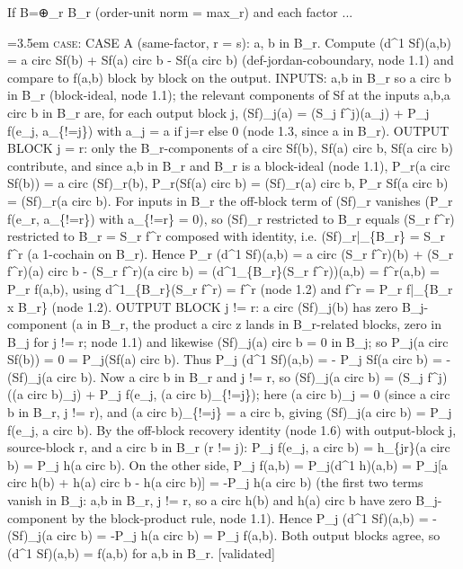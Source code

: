 \documentclass{article}
\newcommand{\step}[1]{\par\noindent\hangindent=3.5em\hangafter=1%
  \makebox[3.5em][l]{\textbf{#1.}}}
\newcommand{\steptag}[1]{\hfill{\small\textsf{[#1]}}}
\begin{document}
\begin{proofbox}{If B=⊕\_r B\_r (order-unit norm = max\_r) and each factor ...}
\step{1.7.1} \textsc{case}: CASE A (same-factor, r = s): a, b in B\_r. Compute (d\textasciicircum{}1 Sf)(a,b) = a circ Sf(b) + Sf(a) circ b - Sf(a circ b) (def-jordan-coboundary, node 1.1) and compare to f(a,b) block by block on the output. INPUTS: a,b in B\_r so a circ b in B\_r (block-ideal, node 1.1); the relevant components of Sf at the inputs a,b,a circ b in B\_r are, for each output block j, (Sf)\_j(a) = (S\_j f\textasciicircum{}j)(a\_j) + P\_j f(e\_j, a\_\{!=j\}) with a\_j = a if j=r else 0 (node 1.3, since a in B\_r). OUTPUT BLOCK j = r: only the B\_r-components of a circ Sf(b), Sf(a) circ b, Sf(a circ b) contribute, and since a,b in B\_r and B\_r is a block-ideal (node 1.1), P\_r(a circ Sf(b)) = a circ (Sf)\_r(b), P\_r(Sf(a) circ b) = (Sf)\_r(a) circ b, P\_r Sf(a circ b) = (Sf)\_r(a circ b). For inputs in B\_r the off-block term of (Sf)\_r vanishes (P\_r f(e\_r, a\_\{!=r\}) with a\_\{!=r\} = 0), so (Sf)\_r restricted to B\_r equals (S\_r f\textasciicircum{}r) restricted to B\_r = S\_r f\textasciicircum{}r composed with identity, i.e. (Sf)\_r|\_\{B\_r\} = S\_r f\textasciicircum{}r (a 1-cochain on B\_r). Hence P\_r (d\textasciicircum{}1 Sf)(a,b) = a circ (S\_r f\textasciicircum{}r)(b) + (S\_r f\textasciicircum{}r)(a) circ b - (S\_r f\textasciicircum{}r)(a circ b) = (d\textasciicircum{}1\_\{B\_r\}(S\_r f\textasciicircum{}r))(a,b) = f\textasciicircum{}r(a,b) = P\_r f(a,b), using d\textasciicircum{}1\_\{B\_r\}(S\_r f\textasciicircum{}r) = f\textasciicircum{}r (node 1.2) and f\textasciicircum{}r = P\_r f|\_\{B\_r x B\_r\} (node 1.2). OUTPUT BLOCK j != r: a circ (Sf)\_j(b) has zero B\_j-component (a in B\_r, the product a circ z lands in B\_r-related blocks, zero in B\_j for j != r; node 1.1) and likewise (Sf)\_j(a) circ b = 0 in B\_j; so P\_j(a circ Sf(b)) = 0 = P\_j(Sf(a) circ b). Thus P\_j (d\textasciicircum{}1 Sf)(a,b) = - P\_j Sf(a circ b) = - (Sf)\_j(a circ b). Now a circ b in B\_r and j != r, so (Sf)\_j(a circ b) = (S\_j f\textasciicircum{}j)((a circ b)\_j) + P\_j f(e\_j, (a circ b)\_\{!=j\}); here (a circ b)\_j = 0 (since a circ b in B\_r, j != r), and (a circ b)\_\{!=j\} = a circ b, giving (Sf)\_j(a circ b) = P\_j f(e\_j, a circ b). By the off-block recovery identity (node 1.6) with output-block j, source-block r, and a circ b in B\_r (r != j): P\_j f(e\_j, a circ b) = h\_\{jr\}(a circ b) = P\_j h(a circ b). On the other side, P\_j f(a,b) = P\_j(d\textasciicircum{}1 h)(a,b) = P\_j[a circ h(b) + h(a) circ b - h(a circ b)] = -P\_j h(a circ b) (the first two terms vanish in B\_j: a,b in B\_r, j != r, so a circ h(b) and h(a) circ b have zero B\_j-component by the block-product rule, node 1.1). Hence P\_j (d\textasciicircum{}1 Sf)(a,b) = -(Sf)\_j(a circ b) = -P\_j h(a circ b) = P\_j f(a,b). Both output blocks agree, so (d\textasciicircum{}1 Sf)(a,b) = f(a,b) for a,b in B\_r. \steptag{validated} \\[4pt]

\end{proofbox}
\end{document}
